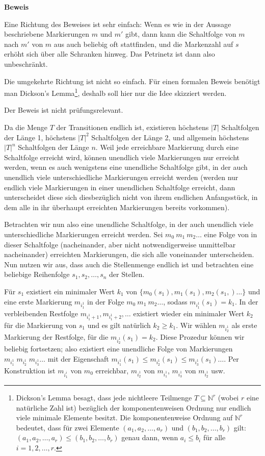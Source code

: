 \textbf{Beweis}

Eine Richtung des Beweises ist sehr einfach: Wenn es wie in der Aussage beschriebene Markierungen $m$ und $m'$ gibt, dann kann die Schaltfolge von $m$ nach $m'$ von $m$ aus auch beliebig oft stattfinden, und die Markenzahl auf $s$ erhöht sich über alle Schranken hinweg. Das Petrinetz ist dann also unbeschränkt.

Die umgekehrte Richtung ist nicht so einfach. Für einen formalen Beweis benötigt man Dickson's Lemma\footnote{
	Dickson's Lemma besagt, dass jede nichtleere Teilmenge $T \subseteq \mathbb{N}^r$ (wobei $r$ eine natürliche Zahl ist) bezüglich der komponentenweisen Ordnung nur endlich viele minimale Elemente besitzt. Die komponentenweise Ordnung auf $\mathbb{N}^r$ bedeutet, dass für zwei Elemente $(a_1, a_2, \dots, a_r)$ und $(b_1, b_2, \dots, b_r)$ gilt: 
	$(a_1, a_2, \dots, a_r) \leq (b_1, b_2, \dots, b_r)$ genau dann, wenn $a_i \leq b_i$ für alle $i = 1, 2, \dots, r$.
	}, 
deshalb soll hier nur die Idee skizziert werden. 

\clearpage %

Der Beweis ist nicht prüfungsrelevant.

Da die Menge $T$ der Transitionen endlich ist, existieren höchstens $|T|$ Schaltfolgen der Länge 1, höchstens $|T|^2$ Schaltfolgen der Länge 2, und allgemein höchstens $|T|^n$ Schaltfolgen der Länge $n$. Weil jede erreichbare Markierung durch eine Schaltfolge erreicht wird, können unendlich viele Markierungen nur erreicht werden, wenn es auch wenigstens eine unendliche Schaltfolge gibt, in der auch unendlich viele unterschiedliche Markierungen erreicht werden (werden nur endlich viele Markierungen in einer unendlichen Schaltfolge erreicht, dann unterscheidet diese sich diesbezüglich nicht von ihrem endlichen Anfangsstück, in dem alle in ihr überhaupt erreichten Markierungen bereits vorkommen).

Betrachten wir nun also eine unendliche Schaltfolge, in der auch unendlich viele unterschiedliche Markierungen erreicht werden. Sei $m_0 \: m_1 \: m_2 \ldots$ eine Folge von in dieser Schaltfolge (nacheinander, aber nicht notwendigerweise unmittelbar nacheinander) erreichten Markierungen, die sich alle voneinander unterscheiden. Nun nutzen wir aus, dass auch die Stellenmenge endlich ist und betrachten eine beliebige Reihenfolge $s_1, s_2, \ldots , s_n$ der Stellen.

Für $s_1$ existiert ein minimaler Wert $k_1$ von $\{m_0 (s_1), m_1 (s_1), m_2 (s_1,)\ldots\}$ und eine erste Markierung $m_{i^1_1}$ in der Folge $m_0 \: m_1 \: m_2 \ldots$, sodass $m_{i^1_1} (s_1) = k_1$. In der verbleibenden Restfolge $m_{i^1_1+1}, m_{i^1_1+2}, \ldots$ existiert wieder ein minimaler Wert $k_2$ für die Markierung von $s_1$ und es gilt natürlich $k_2 \geq k_1$. Wir wählen  $m_{i^1_2}$ als erste Markierung der Restfolge, für die $m_{i^1_2} (s_1) = k_2$. Diese Prozedur können wir beliebig fortsetzen; also existiert eine unendliche Folge von Markierungen $m_{i^1_1}\; m_{i^1_2} \;m_{i^1_3}\ldots$ mit der Eigenschaft $m_{i^1_1} (s_1) \leq m_{i^1_2}(s_1) \leq  m_{i^1_3} (s_1)\ldots$. Per Konstruktion ist $m_{i^i_1}$ von $m_0$ erreichbar, $m_{i^1_2} $ von $m_{i^1_1} $, $m_{i^1_3} $ von $m_{i^1_2} $ usw.

